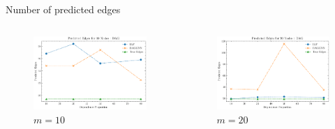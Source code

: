 \documentclass{beamer}
\begin{document}
\begin{frame}{Number of predicted edges}
    \begin{columns}
        \begin{column}{0.5\textwidth}
            \begin{figure}
                \centering
                \includegraphics[scale=0.3]{fig/Predicted Edges_dependence_10_DAG_threshold0.3.pdf}
                \caption{$m=10$}
                \label{fig:dep_gaussian_edges_10}
            \end{figure}
        \end{column}
        \begin{column}{0.5\textwidth}
            \begin{figure}
            \centering
            \includegraphics[scale=0.3]{fig/Predicted Edges_dependence_20_DAG_threshold0.3.pdf}
            \caption{$m=20$}
            \label{fig:dep_gaussian_edges_20}

\end{figure}
\end{column}
\end{columns}
\end{frame}
\end{document}
